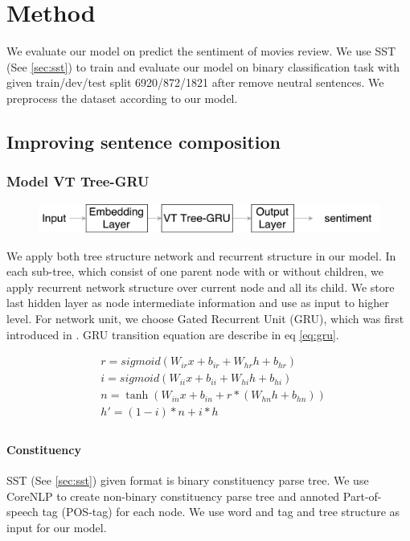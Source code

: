 \chapter{Method}
We evaluate our model on predict the sentiment of movies review. We use SST (See \ref{sec:sst}) to train and evaluate our model on binary classification task with given train/dev/test split 6920/872/1821 after remove neutral sentences. We preprocess the dataset according to our model.

\section{Improving sentence composition}

\subsection{Model VT Tree-GRU}\label{sec:VTtree}
\begin{figure}[H]
	\centering
	\includegraphics[width=0.8\linewidth]{figure/vtgrusummary.pdf}
	\caption[Convolution Tree LSTM]{}
	\label{fig:vtgrusummary}
\end{figure}

We apply both tree structure network and recurrent structure in our model. In each sub-tree, which consist of one parent node with or without children, we apply recurrent network structure over current node and all its child. We store last hidden layer as node intermediate information and use as input to higher level. For network unit, we choose Gated Recurrent Unit (GRU), which was first introduced in \cite{cho2014learning}. GRU transition equation are describe in eq \ref{eq:gru}.

\begin{equation}
\label{eq:gru}
\begin{aligned}
&r = sigmoid(W_{ir} x + b_{ir} + W_{hr} h + b_{hr}) \\
&i = sigmoid(W_{ii} x + b_{ii} + W_{hi} h + b_{hi}) \\
&n = \tanh(W_{in} x + b_{in} + r * (W_{hn} h + b_{hn})) \\
&h' = (1 - i) * n + i * h\\
\end{aligned}
\end{equation}

\subsubsection{Constituency} \label{sec:VTtreeConstituency}
SST (See \ref{sec:sst}) given format is binary constituency parse tree. We use CoreNLP \cite{manning2014stanford} to create non-binary constituency parse tree and annoted Part-of-speech tag (POS-tag) for each node. We use word and tag and tree structure as input for our model.

